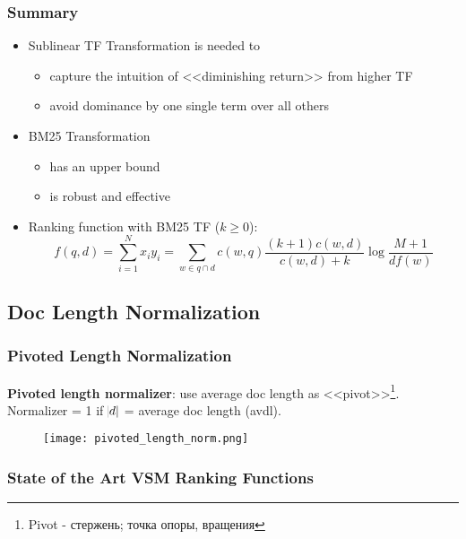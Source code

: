 \subsubsection{Summary}
\begin{itemize}
\item Sublinear TF Transformation is needed to
\begin{itemize}
\item capture the intuition of <<diminishing return>> from higher TF 
\item avoid dominance by one single term over all others
\end{itemize}

\item BM25 Transformation 
\begin{itemize}
\item has an upper bound
\item is robust and effective
\end{itemize}

\item Ranking function with BM25 TF ($k \geqslant 0$):
\begin{equation*}
f(q, d) = \sum_{i=1}^N x_i y_i = \sum_{w \in q \cap d} c(w, q) \frac{(k+1) c(w, d)}{c(w, d) + k} \log \frac{M+1}{df(w)}
\end{equation*}
\end{itemize}


\subsection{Doc Length Normalization}
\subsubsection{Pivoted Length Normalization}

\textbf{Pivoted length normalizer}: use average doc length as <<pivot>>\footnote{Pivot - стержень; точка опоры, вращения}. Normalizer = 1 if $\abs{d}$ = average doc length (avdl).

\begin{figure}[H]
    \centering
    \texttt{[image: pivoted\_length\_norm.png]}
\end{figure}


\subsubsection{State of the Art VSM Ranking Functions}


